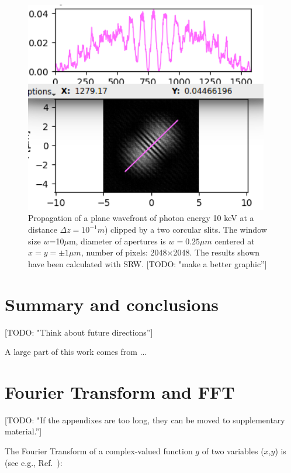 \documentclass{iucr}              %
\newcommand{\todo}[1]{{\color{red}[TODO: "#1'']}}
\begin{document}
\begin{figure}
\label{fig: srw two slits}
\caption{Propagation of a plane wavefront of photon energy 10 keV at a distance $\Delta z = 10^{-1}m$) clipped by a two corcular slits. The window size $w$=10$\mu$m, diameter of apertures is $w=0.25\mu m$ centered at $x=y=\pm 1 \mu m$, number of pixels: 2048$\times$2048. The results shown have been calculated with SRW. \todo{make a better graphic}
}
\includegraphics[width=0.95\textwidth]{srw_two_slits.png}
\end{figure}


\section{Summary and conclusions}

\todo{Think about future directions}

%
%
A large part of this work comes from ...

\appendix
\section{Fourier Transform and FFT}
\label{appendix_fft}

\todo{If the appendixes are too long, they can be moved to supplementary material.}

The Fourier Transform of a complex-valued function $g$ of two variables ($x$,$y$) is (see e.g., Ref.~\cite{goodmanfourier}): 
\end{document}

